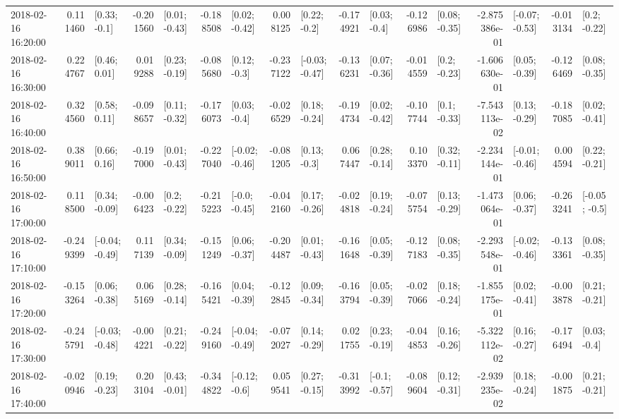 \begin{tabular}{lrlrlrlrlrlrlrlrl}
2018-02-16 16:20:00 &  0.111460 &    [0.33; -0.1] & -0.201560 &   [0.01; -0.43] & -0.188508 &   [0.02; -0.42] &  0.008125 &    [0.22; -0.2] & -0.174921 &    [0.03; -0.4] & -0.126986 &   [0.08; -0.35] & -2.875386e-01 &  [-0.07; -0.53] & -0.013134 &    [0.2; -0.22] \\
2018-02-16 16:30:00 &  0.224767 &    [0.46; 0.01] &  0.019288 &   [0.23; -0.19] & -0.085680 &    [0.12; -0.3] & -0.237122 &  [-0.03; -0.47] & -0.136231 &   [0.07; -0.36] & -0.014559 &    [0.2; -0.23] & -1.606630e-01 &   [0.05; -0.39] & -0.126469 &   [0.08; -0.35] \\
2018-02-16 16:40:00 &  0.324560 &    [0.58; 0.11] & -0.098657 &   [0.11; -0.32] & -0.176073 &    [0.03; -0.4] & -0.026529 &   [0.18; -0.24] & -0.194734 &   [0.02; -0.42] & -0.107744 &    [0.1; -0.33] & -7.543113e-02 &   [0.13; -0.29] & -0.187085 &   [0.02; -0.41] \\
2018-02-16 16:50:00 &  0.389011 &    [0.66; 0.16] & -0.197000 &   [0.01; -0.43] & -0.227040 &  [-0.02; -0.46] & -0.081205 &    [0.13; -0.3] &  0.067447 &   [0.28; -0.14] &  0.103370 &   [0.32; -0.11] & -2.234144e-01 &  [-0.01; -0.46] &  0.004594 &   [0.22; -0.21] \\
2018-02-16 17:00:00 &  0.118500 &   [0.34; -0.09] & -0.006423 &    [0.2; -0.22] & -0.215223 &   [-0.0; -0.45] & -0.042160 &   [0.17; -0.26] & -0.024818 &   [0.19; -0.24] & -0.075754 &   [0.13; -0.29] & -1.473064e-01 &   [0.06; -0.37] & -0.263241 &   [-0.05; -0.5] \\
2018-02-16 17:10:00 & -0.249399 &  [-0.04; -0.49] &  0.117139 &   [0.34; -0.09] & -0.151249 &   [0.06; -0.37] & -0.204487 &   [0.01; -0.43] & -0.161648 &   [0.05; -0.39] & -0.127183 &   [0.08; -0.35] & -2.293548e-01 &  [-0.02; -0.46] & -0.133361 &   [0.08; -0.35] \\
2018-02-16 17:20:00 & -0.153264 &   [0.06; -0.38] &  0.065169 &   [0.28; -0.14] & -0.165421 &   [0.04; -0.39] & -0.122845 &   [0.09; -0.34] & -0.163794 &   [0.05; -0.39] & -0.027066 &   [0.18; -0.24] & -1.855175e-01 &   [0.02; -0.41] & -0.003878 &   [0.21; -0.21] \\
2018-02-16 17:30:00 & -0.245791 &  [-0.03; -0.48] & -0.004221 &   [0.21; -0.22] & -0.249160 &  [-0.04; -0.49] & -0.072027 &   [0.14; -0.29] &  0.021755 &   [0.23; -0.19] & -0.044853 &   [0.16; -0.26] & -5.322112e-02 &   [0.16; -0.27] & -0.176494 &    [0.03; -0.4] \\
2018-02-16 17:40:00 & -0.020946 &   [0.19; -0.23] &  0.203104 &   [0.43; -0.01] & -0.344822 &   [-0.12; -0.6] &  0.059541 &   [0.27; -0.15] & -0.313992 &   [-0.1; -0.57] & -0.089604 &   [0.12; -0.31] & -2.939235e-02 &   [0.18; -0.24] & -0.001875 &   [0.21; -0.21] \\

\end{tabular}
